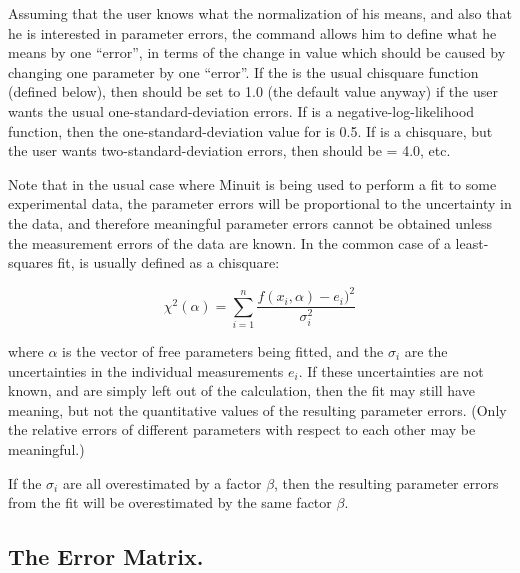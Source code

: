 Assuming that the user knows what the normalization of his  means, and
also that he is interested in parameter errors, the  command
allows him to define what he means by one ``error'', in terms of the
change in  value which should be caused by changing one parameter by
one ``error''.  
If the  is the usual chisquare function (defined below),
then  should be set to 1.0 
(the default value anyway) if the user
wants the usual one-standard-deviation errors.
If  is a negative-log-likelihood
function, then the one-standard-deviation value for 
 is 0.5.
If  is a chisquare, but the user wants two-standard-deviation errors, then
 should be = 4.0, etc.
 
Note that in the usual case where Minuit is being used to perform a fit to
some experimental data, the parameter errors will be proportional to the
uncertainty in the data, and therefore meaningful parameter errors cannot
be obtained unless the measurement errors of the data are known.  In the common
case of a least-squares fit,  is usually defined as a chisquare:

\begin{equation}
\chi^2 (\alpha) = \sum_{i=1}^{n} \frac{f(x_i,\alpha) - e_i)^2}{\sigma_i^2}
\end{equation}

where $\alpha$ is the vector of free parameters being fitted, and
the $\sigma_i$ are the uncertainties in the individual measurements $e_i$.
If these uncertainties are not known, and are simply left out of the calculation,
then the fit may still have meaning, but not the quantitative values of the
resulting parameter errors.
(Only the relative errors of different parameters with
respect to each other may be meaningful.)
 
If the $\sigma_i$ are all overestimated by a factor $\beta$, then the resulting
parameter errors from the fit will be overestimated by the same factor $\beta$.

\subsection{The Error Matrix.}

